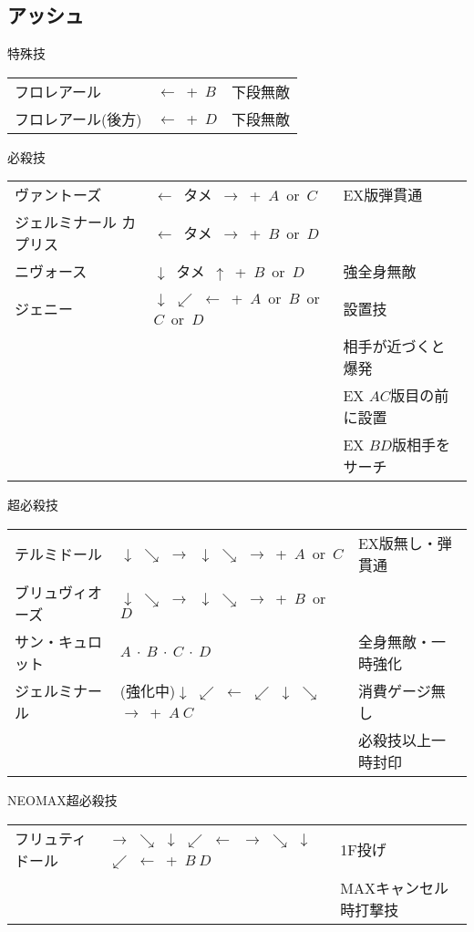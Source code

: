 \documentclass[a4j,11pt]{jarticle}
\def\vtame{$\downarrow$\ タメ\ $\uparrow$}
\def\htame{$\leftarrow$\ タメ\ $\rightarrow$}
\def\hado{$\downarrow$ $\searrow$ $\rightarrow$}%
\def\tatsu{$\downarrow$ $\swarrow$ $\leftarrow$}%
\def\gyakuyoga{$\rightarrow$ $\searrow$ $\downarrow$ $\swarrow$ $\leftarrow$}%
\def\orochi{$\downarrow$ $\swarrow$ $\leftarrow$ $\swarrow$ $\downarrow$ $\searrow$ $\rightarrow$}%
\begin{document}
\subsection{アッシュ}
\begin{itembox}[l]{特殊技}
\begin{tabular}{lll}
フロレアール&$\leftarrow$\ +\ $B$&下段無敵\\%
フロレアール(後方)&$\leftarrow$\ +\ $D$&下段無敵%
\end{tabular}
\end{itembox}
\begin{itembox}[l]{必殺技}
\begin{tabular}{lll}
ヴァントーズ&\htame\ +\ $A$\ or\ $C$&EX版弾貫通\\%
ジェルミナール カプリス&\htame\ +\ $B$\ or\ $D$&\\%
ニヴォース&\vtame\ +\ $B$\ or\ $D$&強全身無敵\\%
ジェニー&\tatsu\ +\ $A$\ or\ $B$\ or\ $C$\ or\ $D$&設置技\\%
&&相手が近づくと爆発\\
&&EX $AC$版目の前に設置\\
&&EX $BD$版相手をサーチ
\end{tabular}
\end{itembox}
\begin{itembox}[l]{超必殺技}
\begin{tabular}{lll}
テルミドール&\hado\ \hado\ +\ $A$\ or\ $C$&EX版無し・弾貫通\\%
ブリュヴィオーズ&\hado\ \hado\ +\ $B$\ or\ $D$&\\%
サン・キュロット&$A\ \cdot\ B\ \cdot\ C\ \cdot\ D$&全身無敵・一時強化\\%
ジェルミナール&(強化中)\orochi\ +\ $A\ C$&消費ゲージ無し\\
&&必殺技以上一時封印%
\end{tabular}
\end{itembox}
\begin{itembox}[l]{NEOMAX超必殺技}
\begin{tabular}{lll}
フリュティドール&\gyakuyoga\ \gyakuyoga\ +\ $B\ D$&1F投げ\\
&&MAXキャンセル時打撃技%
\end{tabular}
\end{itembox}
\newpage
\end{document}
